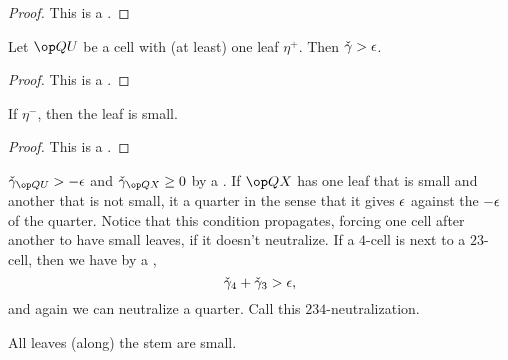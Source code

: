 \begin{proof} This is a .
\end{proof}

\begin{lemma} 
Let $\QU$ be a cell with (at least) one leaf $\eta^+$.  Then $\check\gamma > \epsilon$.
\end{lemma}

\begin{proof} This is a .
\end{proof}

\begin{lemma} If $\eta^-$, then the leaf is small.
\end{lemma}

\begin{proof} This is a .
\end{proof}

\begin{remark}[neutralize]
 $\gg_{\QU} > -\eps$ and $\gg_{\QX}\ge 0$ by a .
If $\QX$ has one leaf that is small and another that is not small, 
it  a quarter in the
sense that it gives $\epsilon$ against the $-\epsilon$ of the quarter.
Notice that this condition propagates, forcing one cell after another to have
small leaves, if it doesn't neutralize.
If a $4$-cell is next to a $23$-cell, then we have by a ,
\[
\check\gamma_4 + \check\gamma_3 > \epsilon,
\]
and again we can neutralize a quarter.  Call this $234$-neutralization.
\end{remark}

\begin{lemma}  All leaves (along) the stem are small.
\end{lemma}

